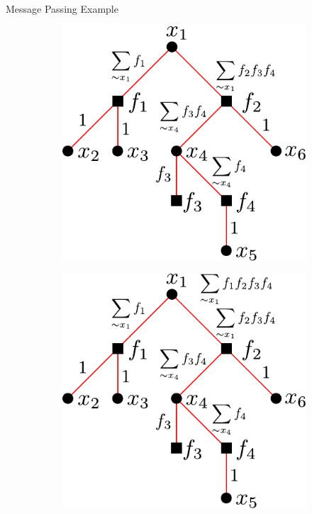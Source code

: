 \documentclass{beamer}
\begin{document}
      \begin{frame}{Message Passing Example}
   \begin{figure}
    \centering
  \begin{subfigure}{0.3\textwidth}
    \includegraphics[scale=0.6]{factor_graph_step4}
  \end{subfigure}
  \hspace{1.5cm}
  \begin{subfigure}{0.3\textwidth}
    \includegraphics[scale=0.6]{factor_graph_step5}
  \end{subfigure}
   \end{figure}

  \end{frame}
  
\end{document}
